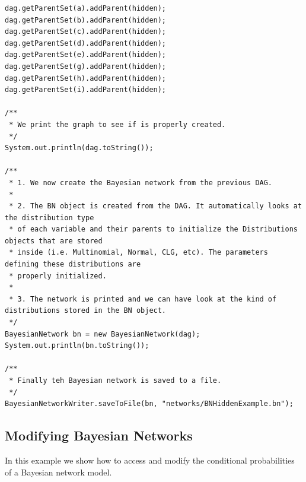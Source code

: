 \begin{lstlisting}
dag.getParentSet(a).addParent(hidden);
dag.getParentSet(b).addParent(hidden);
dag.getParentSet(c).addParent(hidden);
dag.getParentSet(d).addParent(hidden);
dag.getParentSet(e).addParent(hidden);
dag.getParentSet(g).addParent(hidden);
dag.getParentSet(h).addParent(hidden);
dag.getParentSet(i).addParent(hidden);

/**
 * We print the graph to see if is properly created.
 */
System.out.println(dag.toString());

/**
 * 1. We now create the Bayesian network from the previous DAG.
 *
 * 2. The BN object is created from the DAG. It automatically looks at the distribution type
 * of each variable and their parents to initialize the Distributions objects that are stored
 * inside (i.e. Multinomial, Normal, CLG, etc). The parameters defining these distributions are
 * properly initialized.
 *
 * 3. The network is printed and we can have look at the kind of distributions stored in the BN object.
 */
BayesianNetwork bn = new BayesianNetwork(dag);
System.out.println(bn.toString());

/**
 * Finally teh Bayesian network is saved to a file.
 */
BayesianNetworkWriter.saveToFile(bn, "networks/BNHiddenExample.bn");
\end{lstlisting}

\subsection{Modifying Bayesian Networks}

In this example we show how to access and modify the conditional probabilities of a Bayesian network model.

